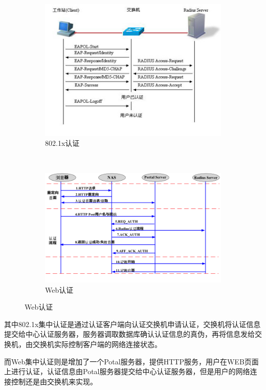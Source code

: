 \documentclass{itecreport-zh}
\begin{document}
\begin{figure}[!h]
\centering
  \begin{subfigure}[b]{0.3\textwidth}
  \includegraphics[width=\textwidth]{8021x.png}
  \caption{802.1x认证}
  \end{subfigure}
  ~
  \begin{subfigure}[b]{0.3\textwidth}
  \includegraphics[width=\textwidth]{web.png}
  \caption{Web认证}
  \end{subfigure}
\end{figure}

其中802.1x集中认证是通过认证客户端向认证交换机申请认证，交换机将认证信息提交给中心认证服务器，服务器调取数据库确认认证信息的真伪，再将信息发给交换机，由交换机实际控制客户端的网络连接状态。

而Web集中认证则是增加了一个Potal服务器，提供HTTP服务，用户在WEB页面上进行认证，认证信息由Potal服务器提交给中心认证服务器，但是用户的网络连接控制还是由交换机来实现。\cite{Ruijie}
\end{document}
